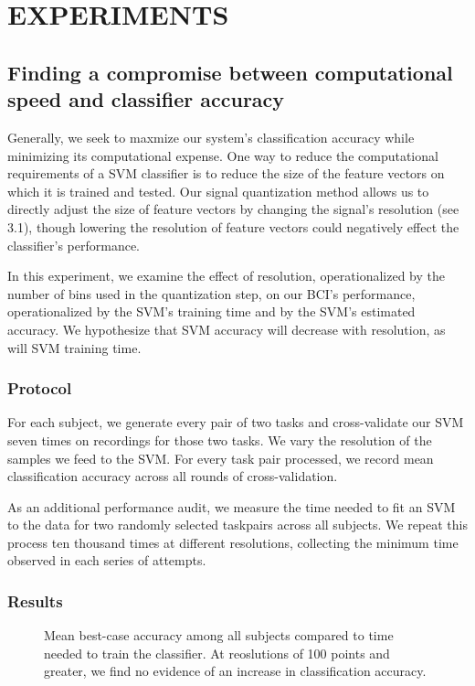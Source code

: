 \section{\uppercase{Experiments}}

\subsection{Finding a compromise between computational speed and classifier accuracy}

Generally, we seek to maxmize our system's classification accuracy while minimizing its computational expense. One way to reduce the computational requirements of a SVM classifier is to reduce the size of the feature vectors on which it is trained and tested. Our signal quantization method allows us to directly adjust the size of feature vectors by changing the signal's resolution (see 3.1), though lowering the resolution of feature vectors could negatively effect the classifier's performance.

In this experiment, we examine the effect of resolution, operationalized by the number of bins used in the quantization step, on our BCI's performance, operationalized by the SVM's training time and by the SVM's estimated accuracy. We hypothesize that SVM accuracy will decrease with resolution, as will SVM training time.

\subsubsection{Protocol}

For each subject, we generate every pair of two tasks and cross-validate our SVM seven times on recordings for those two tasks. We vary the resolution of the samples we feed to the SVM. For every task pair processed, we record mean classification accuracy across all rounds of cross-validation.

As an additional performance audit, we measure the time needed to fit an SVM to the data for two randomly selected taskpairs across all subjects. We repeat this process ten thousand times at different resolutions, collecting the minimum time observed in each series of attempts.

\subsubsection{Results}

\begin{figure}[!h]
  \vspace{-0.2cm}
  \centering
   {}
  \caption{Mean best-case accuracy among all subjects compared to time needed to train the classifier. At reoslutions of 100 points and greater, we find no evidence of an increase in classification accuracy. }
  \label{fig:fig1a}
  \vspace{-0.1cm}
 \end{figure}

